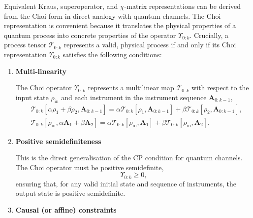 Equivalent Kraus, superoperator, and \(\chi\)-matrix representations can be derived from the Choi form in direct analogy with quantum channels. The Choi representation is convenient because it translates the physical properties of a quantum process into concrete properties of the operator \(\Upsilon_{0:k}\). Crucially, a process tensor \(\mathcal{T}_{0:k}\) represents a valid, physical process if and only if its Choi representation \(\Upsilon_{0:k}\) satisfies the following conditions:
\begin{enumerate}
    \item \textbf{Multi-linearity}

    The Choi operator \(\Upsilon_{0:k}\) represents a multilinear map \(\mathcal{T}_{0:k}\) with respect to the input state \(\rho_{\mathrm{in}}\) and each instrument in the instrument sequence \(\mathbf{A}_{0:k-1}\),
    \begin{equation}
        \begin{split}
            &\mathcal{T}_{0:k}[\alpha\rho_1 + \beta\rho_2, \mathbf{A}_{0:k-1}] = \alpha\mathcal{T}_{0:k}[\rho_1, \mathbf{A}_{0:k-1}] + \beta\mathcal{T}_{0:k}[\rho_2, \mathbf{A}_{0:k-1}], \\
            &\mathcal{T}_{0:k}[\rho_{\mathrm{in}}, \alpha\mathbf{A}_1 + \beta\mathbf{A}_2] = \alpha\mathcal{T}_{0:k}[\rho_{\mathrm{in}}, \mathbf{A}_1] + \beta\mathcal{T}_{0:k}[\rho_{\mathrm{in}}, \mathbf{A}_2].
        \end{split}
    \end{equation}

    \item \textbf{Positive semidefiniteness}
    
    This is the direct generalisation of the CP condition for quantum channels. The Choi operator must be positive semidefinite,
    \begin{equation}
        \Upsilon_{0:k} \geq 0,
    \end{equation}
    ensuring that, for any valid initial state and sequence of instruments, the output state is positive semidefinite.
    \item \textbf{Causal (or affine) constraints}
    

\end{enumerate}
